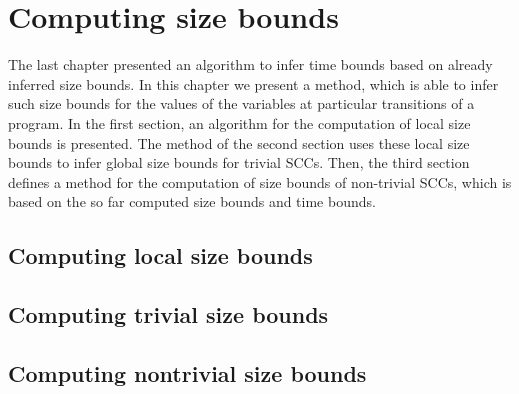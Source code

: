 \section{Computing size bounds}

The last chapter presented an algorithm to infer time bounds based on already inferred size bounds.
In this chapter we present a method, which is able to infer such size bounds for the values of the variables at particular transitions of a program.
In the first section, an algorithm for the computation of local size bounds is presented.
The method of the second section uses these local size bounds to infer global size bounds for trivial SCCs.
Then, the third section defines a method for the computation of size bounds of non-trivial SCCs, which is based on the so far computed size bounds and time bounds.

\subsection{Computing local size bounds}



\subsection{Computing trivial size bounds}



\subsection{Computing nontrivial size bounds}


